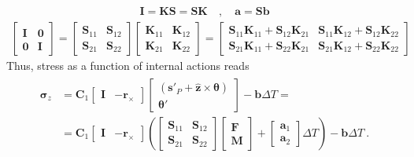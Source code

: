 \documentclass[letterpaper,10pt,english]{jupyterBook}
\begin{document}
\begin{equation*}
\begin{split}\mathbf{I} = \mathbf{K} \mathbf{S} = \mathbf{S} \mathbf{K} \quad , \quad \mathbf{a} = \mathbf{S} \mathbf{b}\end{split}
\end{equation*}\begin{equation*}
\begin{split}
  \begin{bmatrix} \mathbf{I}      & \mathbf{0}      \\ \mathbf{0}      & \mathbf{I}      \end{bmatrix} 
= \begin{bmatrix} \mathbf{S}_{11} & \mathbf{S}_{12} \\ \mathbf{S}_{21} & \mathbf{S}_{22} \end{bmatrix}
  \begin{bmatrix} \mathbf{K}_{11} & \mathbf{K}_{12} \\ \mathbf{K}_{21} & \mathbf{K}_{22} \end{bmatrix}
= \begin{bmatrix} \mathbf{S}_{11}\mathbf{K}_{11} + \mathbf{S}_{12} \mathbf{K}_{21} &
                  \mathbf{S}_{11}\mathbf{K}_{12} + \mathbf{S}_{12} \mathbf{K}_{22} \\
                  \mathbf{S}_{21}\mathbf{K}_{11} + \mathbf{S}_{22} \mathbf{K}_{21} &
                  \mathbf{S}_{21}\mathbf{K}_{12} + \mathbf{S}_{22} \mathbf{K}_{22} \end{bmatrix}
\end{split}
\end{equation*}
\sphinxAtStartPar
Thus, stress as a function of internal actions reads
\begin{equation*}
\begin{split}\begin{aligned}
  \boldsymbol\sigma_z
  & = \mathbf{C}_1 \begin{bmatrix} \mathbf{I} & - \mathbf{r}_{\times} \end{bmatrix} \begin{bmatrix} ( \mathbf{s}'_P + \hat{\mathbf{z}} \times \boldsymbol\theta ) \\ \boldsymbol\theta' \end{bmatrix} - \mathbf{b} \Delta T = \\
  & = \mathbf{C}_1 \begin{bmatrix} \mathbf{I} & - \mathbf{r}_{\times} \end{bmatrix} \left( \begin{bmatrix} \mathbf{S}_{11} & \mathbf{S}_{12} \\ \mathbf{S}_{21} & \mathbf{S}_{22} \end{bmatrix} \begin{bmatrix} \mathbf{F} \\ \mathbf{M} \end{bmatrix} + \begin{bmatrix} \mathbf{a}_1 \\ \mathbf{a}_2 \end{bmatrix} \Delta T \right) - \mathbf{b} \Delta T  \ .
\end{aligned}\end{split}
\end{equation*}
\end{document}
